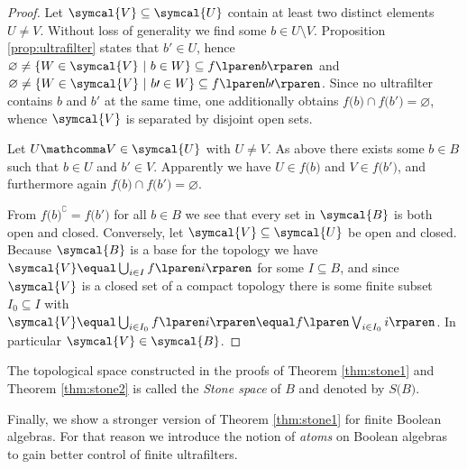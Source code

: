 \begin{proof}
  \smallskip

   \thinspace
  Let $\symcal{V} \subseteq \symcal{U}$ contain
  at least two distinct elements $U \ne V$.
  Without loss of generality we find some $b \in U \setminus V$.
  Proposition \ref{prop:ultrafilter} states that $b \prime \in U$,
  hence
  $\varnothing \ne \lbrace W \in \symcal{V} \pipe b \in W \rbrace
  \subseteq f \lparen b \rparen$
  and
  $\varnothing \ne \lbrace W \in \symcal{V}
  \pipe b \prime \in W \rbrace \subseteq f \lparen b \prime \rparen$.
  Since no ultrafilter contains $b$ and $b \prime$ at the same time,
  one additionally obtains
  $f \lparen b \rparen \cap f \lparen b \prime \rparen
  \equal \varnothing$,
  whence $\symcal{V}$ is separated by disjoint open sets.

  \smallskip

   \thinspace
  Let $U \mathcomma V \in \symcal{U}$ with $U \ne V$.
  As above there exists some $b \in B$ such that $b \in U$ and $b \prime \in V$.
  Apparently we have
  $U \in f \lparen b \rparen$ and $V \in f \lparen b \prime \rparen$,
  and furthermore again
  $f \lparen b \rparen \cap f \lparen b \prime \rparen \equal \varnothing$.

  \smallskip

   \thinspace
  From
  $f \lparen b \rparen ^ \complement \equal f \lparen b \prime \rparen$
  for all $b \in B$ we see
  that every set in $\symcal{B}$ is both open and closed.
  Conversely, let $\symcal{V} \subseteq \symcal{U}$ be open and closed.
  Because $\symcal{B}$ is a base for the topology we have
  $\symcal{V} \equal \bigcup_{ i \in I } f \lparen i \rparen$
  for some $I \subseteq B$,
  and since  $\symcal{V}$ is a closed set of a compact topology
  there is some finite subset $I_0 \subseteq I$ with
  $\symcal{V} \equal \bigcup_{ i \in I_0 } f \lparen i \rparen
  \equal f \lparen \bigvee_{ i \in I_0} i \rparen$.
  In particular $\symcal{V} \in \symcal{B}$.
\end{proof}

\begin{definition}
  The topological space constructed
  in the proofs of Theorem \ref{thm:stone1} and Theorem \ref{thm:stone2}
  is called the \emph{Stone space} of $B$
  and denoted by $S \lparen B \rparen$.
\end{definition}

\medskip

Finally, we show a stronger version of Theorem \ref{thm:stone1}
for finite Boolean algebras.
For that reason we introduce the notion of \emph{atoms} on Boolean algebras
to gain better control of finite ultrafilters.

